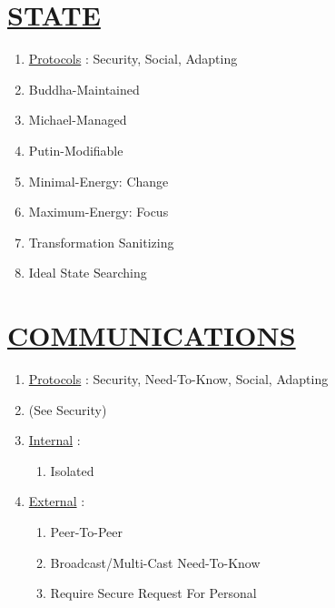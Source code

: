 \documentclass[11pt]{article}
\begin{document}
\section*{\ul{STATE}}
\begin{enumerate}
	\item[] \ul{Protocols} : Security, Social, Adapting
	
	\item[] Buddha-Maintained
	\item[] Michael-Managed
	\item[] Putin-Modifiable
	\item[] Minimal-Energy: Change
	\item[] Maximum-Energy: Focus
	\item[] Transformation Sanitizing
	\item[] Ideal State Searching
	
\end{enumerate}


\section*{\ul{COMMUNICATIONS}}
\begin{enumerate}
	\item[] \ul{Protocols} : Security, Need-To-Know, Social, Adapting
	
	\item[] (See Security)
	
	\item[] \ul{Internal} :
	\begin{enumerate}
		\item[] Isolated
	\end{enumerate}

	\item[] \ul{External} :
	\begin{enumerate}
		\item[] Peer-To-Peer
		\item[] Broadcast/Multi-Cast Need-To-Know
		\item[] Require Secure Request For Personal
	\end{enumerate}

\end{enumerate}
\end{document}
